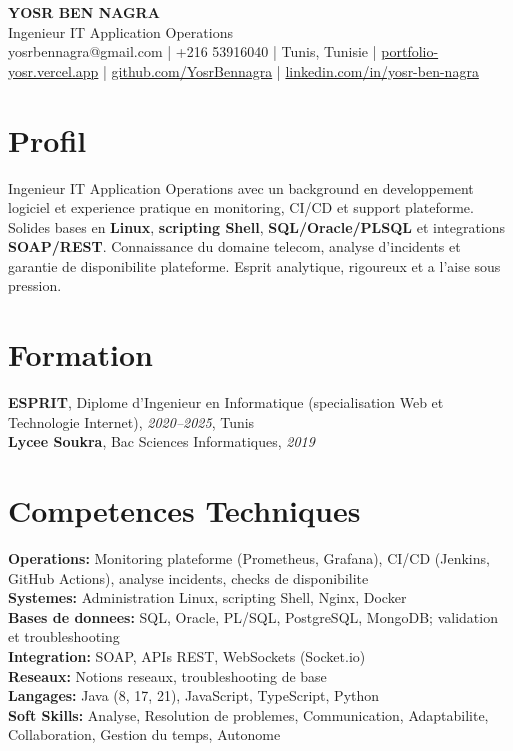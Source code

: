\documentclass[10pt,a4paper]{article}
\begin{document}
\begin{center}
  {\Large\bfseries YOSR BEN NAGRA}\\[2pt]
  {\small Ingenieur IT Application Operations}\\[3pt]
  {\footnotesize yosrbennagra@gmail.com \;|\; +216 53916040 \;|\; Tunis, Tunisie \;|\; \href{https://portfolio-yosr.vercel.app/fr}{portfolio-yosr.vercel.app} \;|\; \href{https://github.com/YosrBennagra}{github.com/YosrBennagra} \;|\; \href{https://www.linkedin.com/in/yosr-ben-nagra/}{linkedin.com/in/yosr-ben-nagra}}
\end{center}

\section*{Profil}
{\small
Ingenieur IT Application Operations avec un background en developpement logiciel et experience pratique en monitoring, CI/CD et support plateforme. Solides bases en \textbf{Linux}, \textbf{scripting Shell}, \textbf{SQL/Oracle/PLSQL} et integrations \textbf{SOAP/REST}. Connaissance du domaine telecom, analyse d'incidents et garantie de disponibilite plateforme. Esprit analytique, rigoureux et a l'aise sous pression.
}

\vspace{4pt}

\section*{Formation}
{\small
\textbf{ESPRIT}, Diplome d'Ingenieur en Informatique (specialisation Web et Technologie Internet), \textit{2020--2025}, Tunis\\[1pt]
\textbf{Lycee Soukra}, Bac Sciences Informatiques, \textit{2019}
}

\vspace{4pt}

\section*{Competences Techniques}
{\small
\textbf{Operations:} Monitoring plateforme (Prometheus, Grafana), CI/CD (Jenkins, GitHub Actions), analyse incidents, checks de disponibilite\\[2pt]
\textbf{Systemes:} Administration Linux, scripting Shell, Nginx, Docker\\[2pt]
\textbf{Bases de donnees:} SQL, Oracle, PL/SQL, PostgreSQL, MongoDB; validation et troubleshooting\\[2pt]
\textbf{Integration:} SOAP, APIs REST, WebSockets (Socket.io)\\[2pt]
\textbf{Reseaux:} Notions reseaux, troubleshooting de base\\[2pt]
\textbf{Langages:} Java (8, 17, 21), JavaScript, TypeScript, Python\\[2pt]
\textbf{Soft Skills:} Analyse, Resolution de problemes, Communication, Adaptabilite, Collaboration, Gestion du temps, Autonome
}
\end{document}
